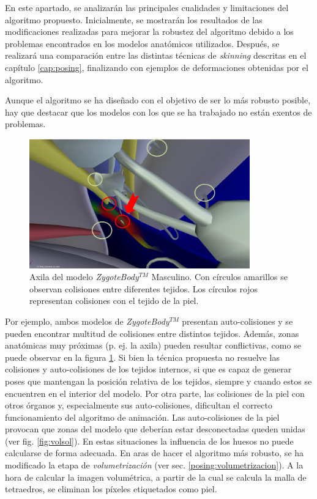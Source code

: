 En este apartado, se analizarán las principales cualidades y limitaciones del algoritmo propuesto. Inicialmente, se mostrarán los resultados de las modificaciones realizadas para mejorar la robustez del algoritmo debido a los problemas encontrados en los modelos anatómicos utilizados. Después, se realizará una comparación entre las distintas técnicas de \emph{skinning} descritas en el capítulo \ref{cap:posing}, finalizando con ejemplos de deformaciones obtenidas por el algoritmo.


Aunque el algoritmo se ha diseñado con el objetivo de ser lo más robusto posible, hay que destacar que los modelos con los que se ha trabajado no están exentos de problemas. 
\begin{figure}[ht]
   \centering
    \includegraphics[width=0.85\textwidth]{IMG/zygoteproblems.png}
    \caption{Axila del modelo \emph{ZygoteBody}$^{TM}$ Masculino. Con círculos amarillos se observan colisiones entre diferentes tejidos. Los círculos rojos representan colisiones con el tejido de la piel.}
   \label{fig:zygoteproblems}
\end{figure}
Por ejemplo, ambos modelos de \emph{ZygoteBody}$^{TM}$ presentan auto-colisiones y se pueden encontrar multitud de colisiones entre distintos tejidos. Además, zonas anatómicas muy próximas (p. ej. la axila) pueden resultar conflictivas, como se puede observar en la figura \ref{fig:zygoteproblems}. Si bien la técnica propuesta no resuelve las colisiones y auto-colisiones de los tejidos internos, si que es capaz de generar poses que mantengan la posición relativa de los tejidos, siempre y cuando estos se encuentren en el interior del modelo. Por otra parte, las colisiones de la piel con otros órganos y, especialmente sus auto-colisiones, dificultan el correcto funcionamiento del algoritmo de animación. Las auto-colisiones de la piel provocan que zonas del modelo que deberían estar desconectadas queden unidas (ver fig. \ref{fig:volsol}). En estas situaciones la influencia de los huesos no puede calcularse de forma adecuada. En aras de hacer el algoritmo más robusto, se ha modificado la etapa de \emph{volumetrización} (ver sec. \ref{posing:volumetrizacion}). A la hora de calcular la imagen volumétrica, a partir de la cual se calcula la malla de tetraedros, se eliminan los píxeles etiquetados como piel.

